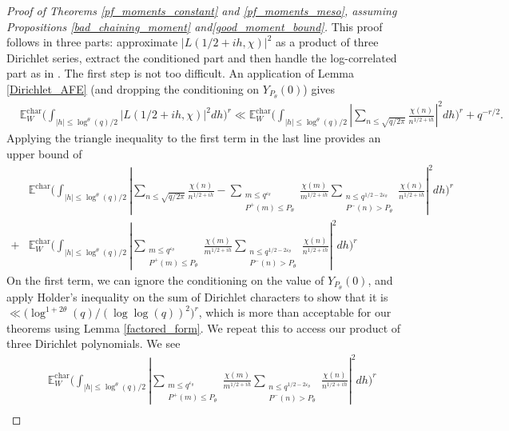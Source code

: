 \documentclass[10pt,a4paper]{amsart}
\numberwithin{equation}{section}
\begin{document}
\begin{proof}[Proof of Theorems \ref{pf_moments_constant} and \ref{pf_moments_meso}, assuming Propositions \ref{bad_chaining_moment} and\ref{good_moment_bound}]
    This proof follows in three parts: approximate $|L(1/2+ih,\chi)|^2$ as a product of three Dirichlet series, extract the conditioned part and then handle the log-correlated part as in \cite{harper2019partition}. The first step is not too difficult. An application of Lemma \ref{Dirichlet_AFE} (and dropping the conditioning on $Y_{P_\theta}(0)$) gives
    \begin{align*}
        &\mathbb{E}_W^{\text{char}}\big(\int_{|h| \leq \log^{\theta}(q)/2}|L(1/2+ih,\chi)|^2dh\big)^r 
        \ll \mathbb{E}_W^{\text{char}}\big(\int_{|h| \leq \log^\theta(q)/2}|\sum_{n \leq \sqrt{q/2\pi}}\frac{\chi(n)}{n^{1/2+ih}}|^2dh\big)^r + q^{-r/2}.
    \end{align*}
    Applying the triangle inequality to the first term in the last line provides an upper bound of
    \begin{align*}
        &\mathbb{E}^{\text{char}}\big(\int_{|h| \leq \log^{\theta}(q)/2}|\sum_{n \leq \sqrt{q/2\pi}}\frac{\chi(n)}{n^{1/2+ih}}-\sum_{\substack{m \leq q^{\varepsilon_\theta} \\ P^+(m) \leq P_\theta}}\frac{\chi(m)}{m^{1/2+ih}}\sum_{\substack{n \leq q^{1/2-2\varepsilon_\theta} \\ P^-(n) > P_\theta}}\frac{\chi(n)}{n^{1/2+ih}}|^2dh\big)^r \\ 
        +& \mathbb{E}_W^{\text{char}}\big(\int_{|h| \leq \log^\theta(q)/2}|\sum_{\substack{m \leq q^{\varepsilon_\theta} \\ P^+(m) \leq P_\theta}}\frac{\chi(m)}{m^{1/2+ih}}\sum_{\substack{n \leq q^{1/2-2\varepsilon_\theta} \\ P^-(n) > P_\theta}}\frac{\chi(n)}{n^{1/2+ih}}|^2dh\big)^r
    \end{align*}
    On the first term, we can ignore the conditioning on the value of $Y_{P_\theta}(0)$, and apply Holder's inequality on the sum of Dirichlet characters to show that it is
    $\ll \big(\log^{1+2\theta}(q)/(\log\log(q))^2\big)^r$,
    which is more than acceptable for our theorems using Lemma \ref{factored_form}. We repeat this to access our product of three Dirichlet polynomials. We see 
    \begin{align*}
        &\mathbb{E}_W^{\text{char}}\big(\int_{|h| \leq \log^\theta(q)/2}|\sum_{\substack{m \leq q^{\varepsilon_\theta} \\ P^+(m) \leq P_\theta}}\frac{\chi(m)}{m^{1/2+ih}}\sum_{\substack{n \leq q^{1/2-2\varepsilon_\theta} \\ P^-(n) > P_\theta}}\frac{\chi(n)}{n^{1/2+ih}}|^2dh\big)^r \\

\end{align*}
\end{proof}
\end{document}

